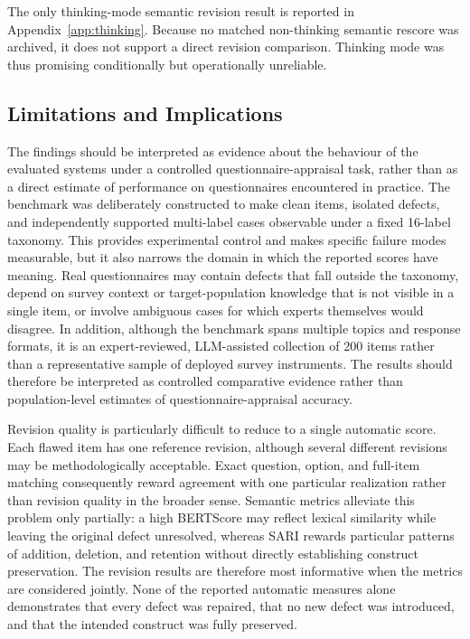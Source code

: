 \documentclass[11pt,a4paper]{article}
\begin{document}
The only thinking-mode semantic revision result is reported in
Appendix~\ref{app:thinking}. Because no matched non-thinking semantic rescore was
archived, it does not support a direct revision comparison. Thinking mode was
thus promising conditionally but operationally unreliable.



\subsection{Limitations and Implications}
\label{subsec:limitations}

The findings should be interpreted as evidence about the behaviour of the evaluated systems under a controlled questionnaire-appraisal task, 
rather than as a direct estimate of performance on questionnaires encountered in practice. The benchmark was deliberately constructed to make 
clean items, isolated defects, and independently supported multi-label cases observable under a fixed 16-label taxonomy. This provides experimental 
control and makes specific failure modes measurable, but it also narrows the domain in which the reported scores have meaning. Real questionnaires may 
contain defects that fall outside the taxonomy, depend on survey context or target-population knowledge that is not visible in a single item, or involve 
ambiguous cases for which experts themselves would disagree. In addition, although the benchmark spans multiple topics and response formats, it is an expert-reviewed, 
LLM-assisted collection of 200 items rather than a representative sample of deployed survey instruments. The results should therefore be interpreted as controlled comparative 
evidence rather than population-level estimates of questionnaire-appraisal accuracy.

Revision quality is particularly difficult to reduce to a single automatic score. Each flawed item has one reference revision, although several different revisions may be 
methodologically acceptable. Exact question, option, and full-item matching consequently reward agreement with one particular realization rather than revision quality in 
the broader sense. Semantic metrics alleviate this problem only partially: a high BERTScore may reflect lexical similarity while leaving the original defect unresolved, 
whereas SARI rewards particular patterns of addition, deletion, and retention without directly establishing construct preservation. The revision results are therefore most 
informative when the metrics are considered jointly. None of the reported automatic measures alone demonstrates that every defect was repaired, that no new defect was introduced, 
and that the intended construct was fully preserved.
\end{document}
